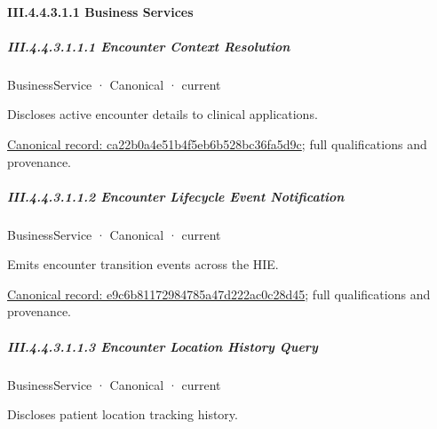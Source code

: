 \paragraph*{III.4.4.3.1.1 Business Services}
\label{navigation:III.4.4.3.1.1}

\subparagraph*{III.4.4.3.1.1.1 Encounter Context Resolution}
\label{navigation:III.4.4.3.1.1.1}

\label{element:ca22b0a4e51b4f5eb6b528bc36fa5d9c}
{\small BusinessService · Canonical · current}\par

Discloses active encounter details to clinical applications.


{\footnotesize \href{../../../../../../../../continuum/business/business-service/ca22b0a4e51b4f5eb6b528bc36fa5d9c.md}{Canonical record: ca22b0a4e51b4f5eb6b528bc36fa5d9c}; full qualifications and provenance.}\par
\subparagraph*{III.4.4.3.1.1.2 Encounter Lifecycle Event Notification}
\label{navigation:III.4.4.3.1.1.2}

\label{element:e9c6b81172984785a47d222ac0c28d45}
{\small BusinessService · Canonical · current}\par

Emits encounter transition events across the HIE.


{\footnotesize \href{../../../../../../../../continuum/business/business-service/e9c6b81172984785a47d222ac0c28d45.md}{Canonical record: e9c6b81172984785a47d222ac0c28d45}; full qualifications and provenance.}\par
\subparagraph*{III.4.4.3.1.1.3 Encounter Location History Query}
\label{navigation:III.4.4.3.1.1.3}

\label{element:5f0f9fec1d16458aaf914b0957793953}
{\small BusinessService · Canonical · current}\par

Discloses patient location tracking history.


